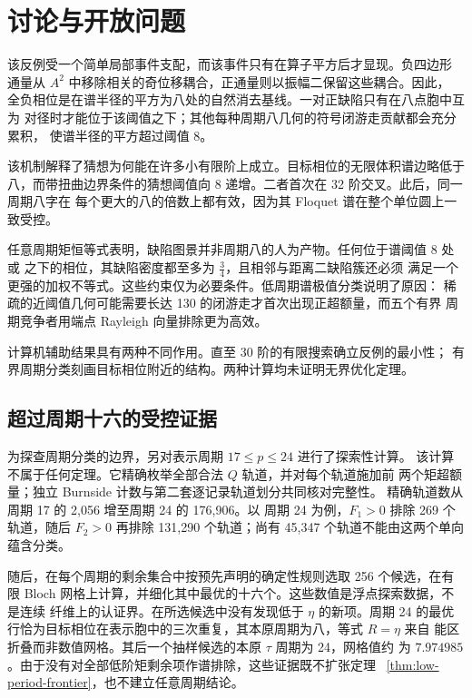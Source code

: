 \section{讨论与开放问题}\label{sec:discussion}

该反例受一个简单局部事件支配，而该事件只有在算子平方后才显现。负四边形
通量从 \(A^2\) 中移除相关的奇位移耦合，正通量则以振幅二保留这些耦合。因此，
全负相位是在谱半径的平方为八处的自然消去基线。一对正缺陷只有在八点胞中互为
对径时才能位于该阈值之下；其他每种周期八几何的符号闭游走贡献都会充分累积，
使谱半径的平方超过阈值 8。

该机制解释了猜想为何能在许多小有限阶上成立。目标相位的无限体积谱边略低于
八，而带扭曲边界条件的猜想阈值向 8 递增。二者首次在 32 阶交叉。此后，同一周期八字在
每个更大的八的倍数上都有效，因为其 Floquet 谱在整个单位圆上一致受控。

任意周期矩恒等式表明，缺陷图景并非周期八的人为产物。任何位于谱阈值 8 处或
之下的相位，其缺陷密度都至多为 \(\frac34\)，且相邻与距离二缺陷簇还必须
满足一个更强的加权不等式。这些约束仅为必要条件。低周期谱极值分类说明了原因：
稀疏的近阈值几何可能需要长达 130 的闭游走才首次出现正超额量，而五个有界
周期竞争者用端点 Rayleigh 向量排除更为高效。

计算机辅助结果具有两种不同作用。直至 30 阶的有限搜索确立反例的最小性；
有界周期分类刻画目标相位附近的结构。两种计算均未证明无界优化定理。

\subsection{超过周期十六的受控证据}

为探查周期分类的边界，另对表示周期 \(17\leq p\leq24\) 进行了探索性计算。
该计算不属于任何定理。它精确枚举全部合法 \(Q\) 轨道，并对每个轨道施加前
两个矩超额量；独立 Burnside 计数与第二套逐记录轨道划分共同核对完整性。
精确轨道数从周期 17 的 2,056 增至周期 24 的 176,906。以
周期 24 为例，\(F_1>0\) 排除 269 个轨道，随后 \(F_2>0\) 再排除 131,290
个轨道；尚有 45,347 个轨道不能由这两个单向蕴含分类。

随后，在每个周期的剩余集合中按预先声明的确定性规则选取 256 个候选，在有限
Bloch 网格上计算，并细化其中最优的十六个。这些数值是浮点探索数据，不是连续
纤维上的认证界。在所选候选中没有发现低于 \(\eta\) 的新项。周期 24 的最优
行恰为目标相位在表示胞中的三次重复，其本原周期为八，等式 \(R=\eta\) 来自
能区折叠而非数值网格。其后一个抽样候选的本原 \(\tau\) 周期为 24，网格值约
为 \(7.974985\)。由于没有对全部低阶矩剩余项作谱排除，这些证据既不扩张定理~
\ref{thm:low-period-frontier}，也不建立任意周期结论。

